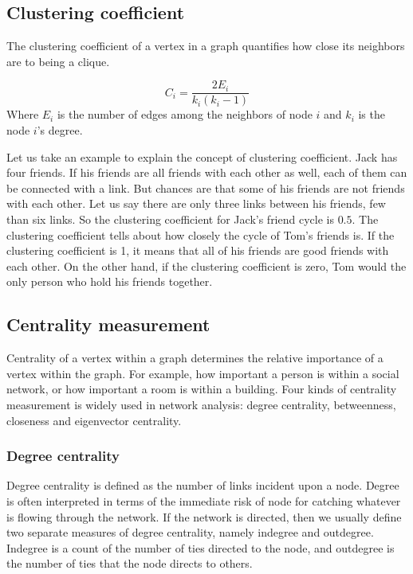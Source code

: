 \subsection{Clustering coefficient}
The clustering coefficient of a vertex in a graph quantifies how close its neighbors are to being a clique\cite{www-clustering}. 

\begin{equation}
C_i=\frac{2E_i}{k_i(k_i-1)}
\end {equation}
Where $E_i$ is the number of edges among the neighbors of node $i$ and $k_i$ is the node $i$'s degree. 

Let us take an example to explain the concept of clustering coefficient. Jack has four friends. If his friends are all friends with each other as well, each of them can be connected with a link. But chances are that some of his friends are not friends with each other. Let us say there are only three links between his friends, few than six links. So the clustering coefficient for Jack's friend cycle is $0.5$. The clustering coefficient tells about how closely the cycle of Tom's friends is. If the clustering coefficient is 1, it means that all of his friends are good friends with each other. On the other hand, if the clustering coefficient is zero, Tom would the only person who hold his friends together.

\subsection{Centrality measurement}

Centrality of a vertex within a graph determines the relative importance of a vertex within the graph\cite{www-centrality}. For example, how important a person is within a social network, or how important a room is within a building. Four kinds of centrality measurement is widely used in network analysis: degree centrality, betweenness, closeness and eigenvector centrality.

\subsubsection{Degree centrality}
Degree centrality is defined as the number of links incident upon a node. Degree is often interpreted in terms of the immediate risk of node for catching whatever is flowing through the network. If the network is directed, then we usually define two separate measures of degree centrality, namely indegree and outdegree. Indegree is a count of the number of ties directed to the node, and outdegree is the number of ties that the node directs to others.
